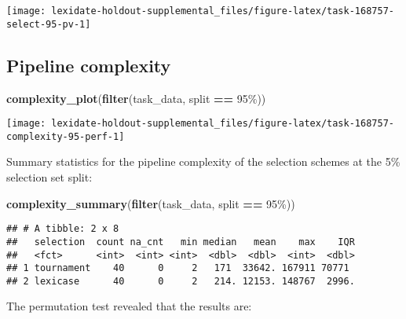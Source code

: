 \documentclass[
]{book}
\newenvironment{Shaded}{\begin{snugshade}}{\end{snugshade}}
\newcommand{\FunctionTok}[1]{\textcolor[rgb]{0.13,0.29,0.53}{\textbf{#1}}}
\newcommand{\NormalTok}[1]{#1}
\newcommand{\SpecialCharTok}[1]{\textcolor[rgb]{0.81,0.36,0.00}{\textbf{#1}}}
\newcommand{\StringTok}[1]{\textcolor[rgb]{0.31,0.60,0.02}{#1}}
\begin{document}
\texttt{[image: lexidate-holdout-supplemental\_files/figure-latex/task-168757-select-95-pv-1]}

\hypertarget{pipeline-complexity-23}{%
\subsection{Pipeline complexity}\label{pipeline-complexity-23}}

\begin{Shaded}
\begin{Highlighting}[]
\FunctionTok{complexity\_plot}\NormalTok{(}\FunctionTok{filter}\NormalTok{(task\_data, split }\SpecialCharTok{==} \StringTok{\textquotesingle{}95\%\textquotesingle{}}\NormalTok{))}
\end{Highlighting}
\end{Shaded}

\texttt{[image: lexidate-holdout-supplemental\_files/figure-latex/task-168757-complexity-95-perf-1]}

Summary statistics for the pipeline complexity of the selection schemes at the 5\% selection set split:

\begin{Shaded}
\begin{Highlighting}[]
\FunctionTok{complexity\_summary}\NormalTok{(}\FunctionTok{filter}\NormalTok{(task\_data, split }\SpecialCharTok{==} \StringTok{\textquotesingle{}95\%\textquotesingle{}}\NormalTok{))}
\end{Highlighting}
\end{Shaded}

\begin{verbatim}
## # A tibble: 2 x 8
##   selection  count na_cnt   min median   mean    max    IQR
##   <fct>      <int>  <int> <int>  <dbl>  <dbl>  <int>  <dbl>
## 1 tournament    40      0     2   171  33642. 167911 70771 
## 2 lexicase      40      0     2   214. 12153. 148767  2996.
\end{verbatim}

The permutation test revealed that the results are:
\end{document}
